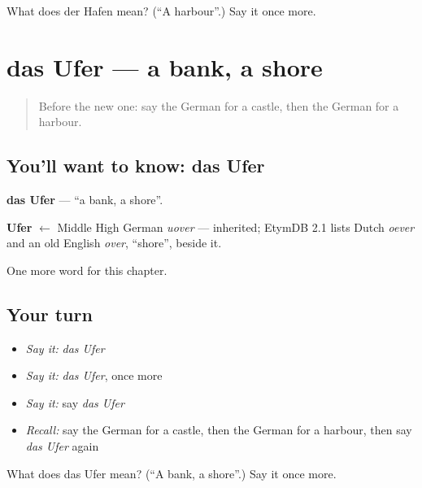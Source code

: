 \begin{tcolorbox}[breakable,colback=teal!4,colframe=teal!35!black,title={Before you move on}]
What does der Hafen mean? (\textquotedblleft{}A harbour\textquotedblright{}.) Say it once more.
\end{tcolorbox}
\section[das Ufer]{das Ufer — a bank, a shore}

\label{lesson:GE-C196-ufer}



\begin{quote}
Before the new one: say the German for a castle, then the German for a harbour.
\end{quote}

\subsection*{You'll want to know: das Ufer}
\textbf{das Ufer} — \textquotedblleft{}a bank, a shore\textquotedblright{}.

\begin{cousinweb}
\textbf{Ufer} $\leftarrow$ Middle High German \emph{uover} — inherited; EtymDB 2.1 lists Dutch \emph{oever} and an old English \emph{over}, \textquotedblleft{}shore\textquotedblright{}, beside it.
\end{cousinweb}

\begin{grammarlens}[title={What you've built}]
One more word for this chapter.
\end{grammarlens}

\subsection*{Your turn}
\begin{itemize}
\raggedright
  \item \emph{Say it:} \emph{das Ufer}
  \item \emph{Say it:} \emph{das Ufer}, once more
  \item \emph{Say it:} say \emph{das Ufer}
  \item \emph{Recall:} say the German for a castle, then the German for a harbour, then say \emph{das Ufer} again
\end{itemize}

\begin{tcolorbox}[breakable,colback=teal!4,colframe=teal!35!black,title={Before you move on}]
What does das Ufer mean? (\textquotedblleft{}A bank, a shore\textquotedblright{}.) Say it once more.
\end{tcolorbox}
